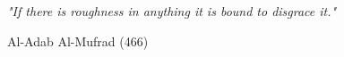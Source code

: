 \documentclass{skripsimathugm}
\begin{document}
\cover\titlepage

\approvalpagescan
\declarepagescan

\acknowledment
\begin{flushright}
\Large\emph{}
\end{flushright}


\motto
\emph{"If there is roughness in anything it is bound to disgrace it."}
\begin{flushright}
 Al-Adab Al-Mufrad (466)
\end{flushright}


\preface
\end{document}
